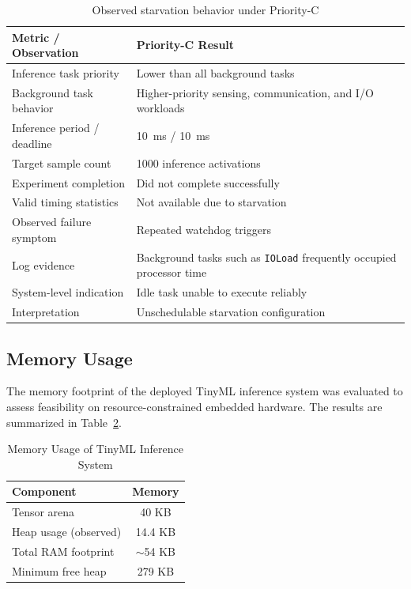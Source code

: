 \documentclass[conference]{IEEEtran}
\begin{document}
\begin{table}[t]
\centering
\caption{Observed starvation behavior under Priority-C}
\label{tab:priority_c_starvation}
\begin{tabular}{p{} p{}}
\hline
\textbf{Metric / Observation} & \textbf{Priority-C Result} \\
\hline
Inference task priority & Lower than all background tasks \\
Background task behavior & Higher-priority sensing, communication, and I/O workloads \\
Inference period / deadline & 10~ms / 10~ms \\
Target sample count & 1000 inference activations \\
Experiment completion & Did not complete successfully \\
Valid timing statistics & Not available due to starvation \\
Observed failure symptom & Repeated watchdog triggers \\
Log evidence & Background tasks such as \texttt{IOLoad} frequently occupied processor time \\
System-level indication & Idle task unable to execute reliably \\
Interpretation & Unschedulable starvation configuration \\
\hline
\end{tabular}
\end{table}

\subsection{Memory Usage}

The memory footprint of the deployed TinyML inference system was evaluated to assess feasibility on resource-constrained embedded hardware. The results are summarized in Table~\ref{tab:memory_usage}.

\begin{table}[h]
\centering
\caption{Memory Usage of TinyML Inference System}
\label{tab:memory_usage}
\begin{tabular}{l c}
\hline
\textbf{Component} & \textbf{Memory} \\
\hline
Tensor arena & 40 KB \\
Heap usage (observed) & 14.4 KB \\
Total RAM footprint & $\sim$54 KB \\
Minimum free heap & 279 KB \\
\hline
\end{tabular}
\end{table}
\end{document}
